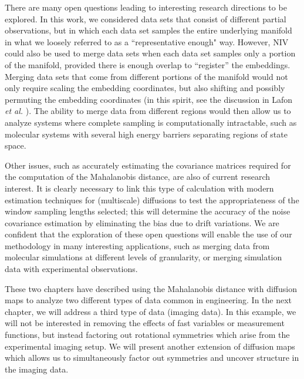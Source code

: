 There are many open questions leading to interesting research directions to be explored.
%
In this work, we considered data sets that consist of different partial observations, but in which each data set samples the entire underlying manifold in
what we loosely referred to as a ``representative enough" way.
%
However, NIV could also be used to merge data sets when each data set samples only a portion of the manifold, provided there is enough overlap to ``register'' the embeddings.
%
Merging data sets that come from different portions of the manifold would not only require scaling the embedding coordinates,
but also shifting and possibly permuting the embedding coordinates (in this spirit, see the discussion in Lafon {\em et al.} \cite{lafon2006data}).
%
The ability to merge data from different regions would then allow us to analyze systems where complete sampling is computationally intractable,
such as molecular systems with several high energy barriers separating regions of state space.

Other issues, such as accurately estimating the covariance matrices required for the computation of the Mahalanobis distance, are also of current research interest.
%
It is clearly necessary to link this type of calculation with modern estimation techniques for (multiscale) diffusions \cite{ait2002maximum, ait2003effects, ait2008closed}
to test the appropriateness of the window sampling lengths selected; this will determine the accuracy of the noise covariance estimation by eliminating
the bias due to drift variations.
%
We are confident that the exploration of these open questions will enable the use of our methodology in many interesting applications, such as merging data from molecular simulations at different levels of granularity, or merging simulation data with experimental observations.

These two chapters have described using the Mahalanobis distance with diffusion maps to analyze two different types of data common in engineering. 
%
In the next chapter, we will address a third type of data (imaging data). 
%
In this example, we will not be interested in removing the effects of fast variables or measurement functions, but instead factoring out rotational symmetries which arise from the experimental imaging setup. 
%
We will present another extension of diffusion maps which allows us to simultaneously factor out symmetries and uncover structure in the imaging data. 




